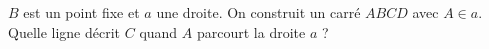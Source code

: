 $B$ est un point fixe et $a$ une droite. On construit un carré $ABCD$ avec $A \in a$. Quelle ligne décrit $C$ quand $A$ parcourt la droite $a$ ?
